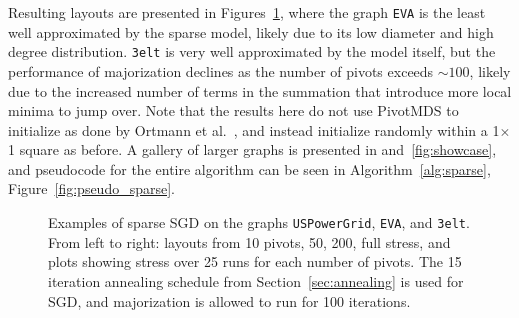 Resulting layouts are presented in Figures~\ref{fig:pivots}, where the graph \texttt{EVA} is the least well approximated by the sparse model, likely due to its low diameter and high degree distribution. \texttt{3elt} is very well approximated by the model itself, but the performance of majorization declines as the number of pivots exceeds $\sim100$, likely due to the increased number of terms in the summation that introduce more local minima to jump over.
Note that the results here do not use PivotMDS \cite{Brandes2007Eigensolver} to initialize as done by Ortmann et al.\ \cite{Ortmann2017}, and instead initialize randomly within a 1$\times$1 square as before.
A gallery of larger graphs is presented in and~\ref{fig:showcase}, and pseudocode for the entire algorithm can be seen in Algorithm~\ref{alg:sparse}, Figure~\ref{fig:pseudo_sparse}.

\begin{figure}
  \centering
  \caption[Results against majorization using sparse stress]{Examples of sparse SGD on the graphs \texttt{USPowerGrid}, \texttt{EVA}, and \texttt{3elt}. From left to right: layouts from 10 pivots, 50, 200, full stress, and plots showing stress over 25 runs for each number of pivots.
  The 15 iteration annealing schedule from Section~\ref{sec:annealing} is used for SGD, and majorization is allowed to run for 100 iterations.
  }
  \label{fig:pivots}
\end{figure}


